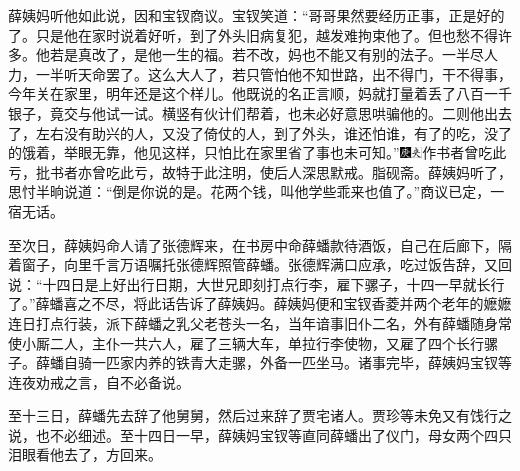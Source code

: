 薛姨妈听他如此说，因和宝钗商议。宝钗笑道：“哥哥果然要经历正事，正是好的了。只是他在家时说着好听，到了外头旧病复犯，越发难拘束他了。但也愁不得许多。他若是真改了，是他一生的福。若不改，妈也不能又有别的法子。一半尽人力，一半听天命罢了。这么大人了，若只管怕他不知世路，出不得门，干不得事，今年关在家里，明年还是这个样儿。他既说的名正言顺，妈就打量着丢了八百一千银子，竟交与他试一试。横竖有伙计们帮着，也未必好意思哄骗他的。二则他出去了，左右没有助兴的人，又没了倚仗的人，到了外头，谁还怕谁，有了的吃，没了的饿着，举眼无靠，他见这样，只怕比在家里省了事也未可知。”{\includegraphics[width=3mm]{../Images/00004}\includegraphics[width=3mm]{../Images/00012}\footnotesize \kaishu 作书者曾吃此亏，批书者亦曾吃此亏，故特于此注明，使后人深思默戒。脂砚斋。}薛姨妈听了，思忖半晌说道：“倒是你说的是。花两个钱，叫他学些乖来也值了。”商议已定，一宿无话。

至次日，薛姨妈命人请了张德辉来，在书房中命薛蟠款待酒饭，自己在后廊下，隔着窗子，向里千言万语嘱托张德辉照管薛蟠。张德辉满口应承，吃过饭告辞，又回说：“十四日是上好出行日期，大世兄即刻打点行李，雇下骡子，十四一早就长行了。”薛蟠喜之不尽，将此话告诉了薛姨妈。薛姨妈便和宝钗香菱并两个老年的嬷嬷连日打点行装，派下薛蟠之乳父老苍头一名，当年谙事旧仆二名，外有薛蟠随身常使小厮二人，主仆一共六人，雇了三辆大车，单拉行李使物，又雇了四个长行骡子。薛蟠自骑一匹家内养的铁青大走骡，外备一匹坐马。诸事完毕，薛姨妈宝钗等连夜劝戒之言，自不必备说。

至十三日，薛蟠先去辞了他舅舅，然后过来辞了贾宅诸人。贾珍等未免又有饯行之说，也不必细述。至十四日一早，薛姨妈宝钗等直同薛蟠出了仪门，母女两个四只泪眼看他去了，方回来。

